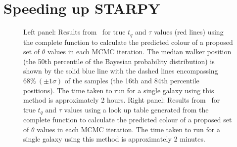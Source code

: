 \section{Speeding up STARPY}\label{lookuptable}

\begin{figure}
\caption[Comparing complete and look-up table versions of \starpy]{Left panel: Results from \starpy ~for true $t_q$ and $\tau$ values (red lines) using the complete function to calculate the predicted colour of a proposed set of $\theta$ values in each MCMC iteration. The median walker position (the 50th percentile of the Bayesian probability distribution) is shown by the solid blue line with the dashed lines encompassing $68\%~(\pm 1\sigma)$ of the samples (the 16th and 84th percentile positions). The time taken to run for a single galaxy using this method is approximately 2 hours. Right panel: Results from \starpy ~for true $t_q$ and $\tau$ values using a look up table generated from the complete function to calculate the predicted colour of a proposed set of $\theta$ values in each MCMC iteration. The time taken to run for a single galaxy using this method is approximately 2 minutes.}
\label{lookup}
\end{figure}

